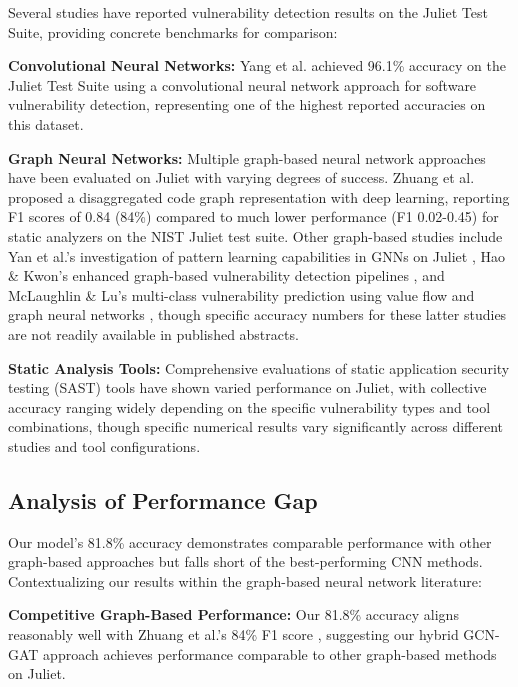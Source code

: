 Several studies have reported vulnerability detection results on the Juliet Test Suite, providing concrete benchmarks for comparison:

\textbf{Convolutional Neural Networks:} Yang et al. \cite{yang2022cnn} achieved 96.1\% accuracy on the Juliet Test Suite using a convolutional neural network approach for software vulnerability detection, representing one of the highest reported accuracies on this dataset.

\textbf{Graph Neural Networks:} Multiple graph-based neural network approaches have been evaluated on Juliet with varying degrees of success. Zhuang et al. \cite{zhuang2021disaggregated} proposed a disaggregated code graph representation with deep learning, reporting F1 scores of 0.84 (84\%) compared to much lower performance (F1 0.02-0.45) for static analyzers on the NIST Juliet test suite. Other graph-based studies include Yan et al.'s investigation of pattern learning capabilities in GNNs on Juliet \cite{yan2022pattern}, Hao \& Kwon's enhanced graph-based vulnerability detection pipelines \cite{hao2024enhancing}, and McLaughlin \& Lu's multi-class vulnerability prediction using value flow and graph neural networks \cite{mclaughlin2024multiclass}, though specific accuracy numbers for these latter studies are not readily available in published abstracts.

\textbf{Static Analysis Tools:} Comprehensive evaluations of static application security testing (SAST) tools have shown varied performance on Juliet, with collective accuracy ranging widely depending on the specific vulnerability types and tool combinations, though specific numerical results vary significantly across different studies and tool configurations.

\subsection{Analysis of Performance Gap}

Our model's 81.8\% accuracy demonstrates comparable performance with other graph-based approaches but falls short of the best-performing CNN methods. Contextualizing our results within the graph-based neural network literature:

\textbf{Competitive Graph-Based Performance:} Our 81.8\% accuracy aligns reasonably well with Zhuang et al.'s 84\% F1 score \cite{zhuang2021disaggregated}, suggesting our hybrid GCN-GAT approach achieves performance comparable to other graph-based methods on Juliet.

